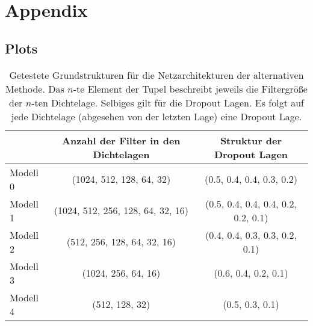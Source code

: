 \chapter{Appendix}
%
\section{Plots}
\begin{table}
  \centering%
  \begin{tabular}{l
                  c
                  c}
      \toprule
      {}    & Anzahl der Filter in den Dichtelagen  & Struktur der Dropout Lagen      \\
      \midrule
      Modell 0    & (1024, 512, 128, 64, 32)  & (0.5, 0.4, 0.4, 0.3, 0.2) \\
      Modell 1    & (1024, 512, 256, 128, 64, 32, 16)  & (0.5, 0.4, 0.4, 0.4, 0.2, 0.2, 0.1) \\
      Modell 2    & (512, 256, 128, 64, 32, 16)  & (0.4, 0.4, 0.3, 0.3, 0.2, 0.1) \\
      Modell 3    & (1024, 256, 64, 16)  & (0.6, 0.4, 0.2, 0.1) \\
      Modell 4    & (512, 128, 32)  & (0.5, 0.3, 0.1) \\
      \bottomrule
  \end{tabular}
  \caption{Getestete Grundstrukturen für die Netzarchitekturen der alternativen Methode. Das $n$-te Element der Tupel beschreibt jeweils die Filtergröße der $n$-ten Dichtelage. Selbiges gilt für die Dropout Lagen. Es folgt auf jede Dichtelage (abgesehen von der letzten Lage) eine Dropout Lage.}
  \label{tab:grid}
\end{table}
%




